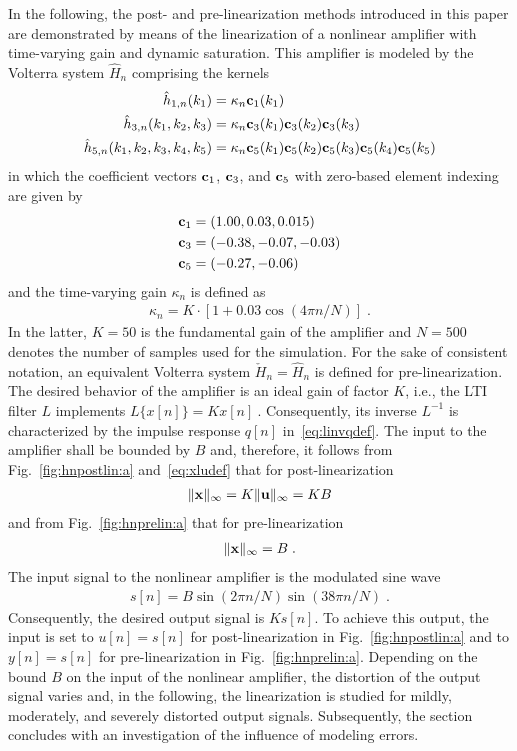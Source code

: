 \documentclass[10pt,twocolumn,twoside]{IEEEtran}
\begin{document}
In the following, the post- and pre-linearization methods introduced in this
paper are demonstrated by means of the linearization of a
nonlinear amplifier with time-varying gain and dynamic saturation.
This amplifier is modeled by the Volterra system $\hat{H}_n$ comprising the kernels
\begin{align*}
	\hat{h}_{1,n}(k_1) &= \kappa_n \bm{\mathrm{c}}_1(k_1)\\
	\hat{h}_{3,n}(k_1,k_2,k_3) &= \kappa_n \bm{\mathrm{c}}_3(k_1) \bm{\mathrm{c}}_3(k_2) \bm{\mathrm{c}}_3(k_3)\\
	\hat{h}_{5,n}(k_1,k_2,k_3,k_4,k_5) &=
		\kappa_n \bm{\mathrm{c}}_5(k_1) \bm{\mathrm{c}}_5(k_2) \bm{\mathrm{c}}_5(k_3) \bm{\mathrm{c}}_5(k_4) \bm{\mathrm{c}}_5(k_5)
\end{align*}
in which the coefficient vectors $\bm{\mathrm{c}}_1$, $\bm{\mathrm{c}}_3$, and $\bm{\mathrm{c}}_5$
with zero-based element indexing are given by
\begin{align}
\begin{split}
	\bm{\mathrm{c}}_1 &= ( 1.00,  0.03,  0.015)\\
	\bm{\mathrm{c}}_3 &= (-0.38, -0.07, -0.03)\\
	\bm{\mathrm{c}}_5 &= (-0.27, -0.06)
\end{split}
	\label{eq:coeffnlamp}
\end{align}
and the time-varying gain $\kappa_n$ is defined as
\begin{align*}
	\kappa_n = K\cdot [1 + 0.03\cos(4\pi n/N)]\;.
\end{align*}
In the latter, $K=50$ is the fundamental gain of the amplifier and
$N=500$ denotes the number of samples used for the simulation. For the sake
of consistent notation, an equivalent Volterra system $\check{H}_n=\hat{H}_n$
is defined for pre-linearization. The desired behavior of the amplifier is
an ideal gain of factor $K$, i.e., the LTI filter $L$ implements $L\{x[n]\} = K x[n]\:$.
Consequently, its inverse $L^{-1}$ is characterized by the impulse
response $q[n]$ in~\eqref{eq:linvqdef}. The input to the amplifier shall
be bounded by $B$ and, therefore, it follows from Fig.~\ref{fig:hnpostlin:a}
and~\eqref{eq:xludef} that for post-linearization
\begin{align}
	\lVert\bm{\mathrm{x}}\rVert_\infty = K\lVert\bm{\mathrm{u}}\rVert_\infty = KB
	\label{eq:simpostxinf}
\end{align}
and from Fig.~\ref{fig:hnprelin:a} that for pre-linearization
\begin{align}
	\lVert\bm{\mathrm{x}}\rVert_\infty = B\;.
	\label{eq:simprexinf}
\end{align}
The input signal to the nonlinear amplifier is the modulated sine wave
\begin{align}
	s[n] = B\sin(2\pi n/N)\sin(38\pi n/N)\;.
	\label{eq:sndef}
\end{align}
Consequently, the desired output
signal is $K s[n]$. To achieve this output, the input is set to $u[n]=s[n]$
for post-linearization in Fig.~\ref{fig:hnpostlin:a} and to $y[n]=s[n]$ for
pre-linearization in Fig.~\ref{fig:hnprelin:a}.
Depending on the bound $B$ on the input of the nonlinear amplifier,
the distortion of the output signal varies and, in the following,
the linearization is studied for mildly, moderately, and severely
distorted output signals. Subsequently, the section concludes with
an investigation of the influence of modeling errors.
\end{document}
